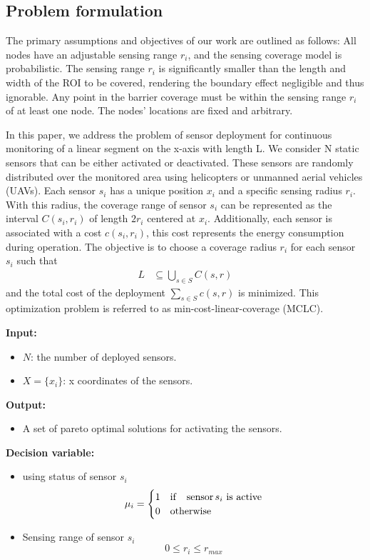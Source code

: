 \documentclass[preprint,12pt]{elsarticle}
\begin{document}
\subsection{Problem formulation}
The primary assumptions and objectives of our work are outlined as follows: All nodes have an adjustable sensing range $r_i$, and the sensing coverage model is probabilistic. The sensing range $r_i$ is significantly smaller than the length and width of the ROI to be covered, rendering the boundary effect negligible and thus ignorable. Any point in the barrier coverage must be within the sensing range $r_i$ of at least one node. The nodes' locations are fixed and arbitrary.

In this paper, we address the problem of sensor deployment for continuous monitoring of a linear segment on the x-axis with length L. We consider N static sensors that can be either activated or deactivated. These sensors are randomly distributed over the monitored area using helicopters or unmanned aerial vehicles (UAVs). Each sensor $s_i$ has a unique position $x_i$ and a specific sensing radius $r_i$. With this radius, the coverage range of sensor $s_i$ can be represented as the interval $C(s_i, r_i)$ of length $2r_i$ centered at $x_i$. Additionally, each sensor is associated with a cost $c(s_i, r_i)$, this cost represents the energy consumption during operation. The objective is to choose a coverage radius $r_i$ for each sensor $s_i$ such that
\begin{align*}
    L & \subseteq \bigcup_{s \in S} C(s, r)
\end{align*}
and the total cost of the deployment $\sum_{s\in S}c(s, r)$ is minimized. This optimization problem is referred to as min-cost-linear-coverage (MCLC).

\textbf{Input:}
\begin{itemize}
  \item $N$: the number of deployed sensors.
  \item $X = \{x_i\}$: x coordinates of the sensors.
\end{itemize}

\textbf{Output:}
\begin{itemize}
    \item A set of pareto optimal solutions for activating the sensors.
\end{itemize}
\textbf{Decision variable:}
\begin{itemize}
    \item using status of sensor $s_i$
\begin{equation}
    {\mu_i} =
    \begin{cases}
        1 & {\rm{if } } \quad \text{sensor} \, s_i \text{ is active} \\
        0 & {\rm{otherwise}}
    \end{cases}
\end{equation}

    \item Sensing range of sensor $s_i$
\begin{equation}
    0 \leq {r_i} \leq {r_{max}}
\end{equation}
\end{itemize}
\end{document}
